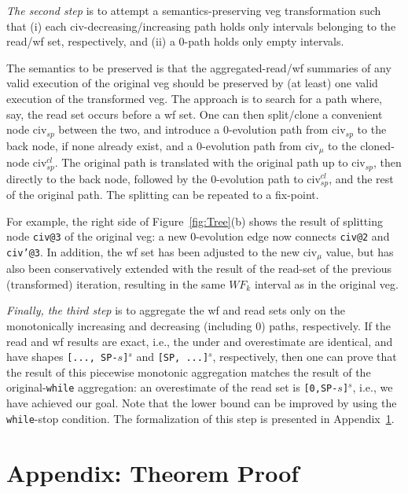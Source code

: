 \documentclass{sig-alternate}
\begin{document}
{\em The second step} is to attempt a semantics-preserving {\sc veg} transformation
such that (i) each {\sc civ}-decreasing/increasing path holds only intervals 
belonging to the read/{\sc wf} set, respectively, and (ii) a $0$-path holds
only empty intervals.

The semantics to be preserved is that the aggregated-read/{\sc wf} summaries of
any valid execution of the original {\sc veg} should be preserved by (at least) one 
valid execution of the transformed {\sc veg}.  The approach is
to search for a path where, say, the read set occurs before a {\sc wf} set.
One can then split/clone a convenient node {\sc civ}$_{sp}$ between the two, and 
introduce a $0$-evolution path from {\sc civ}$_{sp}$ to the back node, if none already exist,
and a $0$-evolution path from {\sc civ}$_\mu$ to the cloned-node {\sc civ}$_{sp}^{cl}$.
The original path is translated with the original path up to {\sc civ}$_{sp}$,
then directly to the back node, followed by the $0$-evolution path to  
{\sc civ}$_{sp}^{cl}$, and the rest of the original path. The splitting can be
repeated to a fix-point.

For example, the right side of Figure~\ref{fig:Tree}(b) shows the result of
splitting  node {\tt civ@3} of the original {\sc veg}: a new $0$-evolution
edge now connects {\tt civ@2} and {\tt civ'@3}. In addition, the {\sc wf} set 
has been adjusted to the new {\sc civ}$_\mu$ value, but has also
been conservatively extended with the result of the read-set of the previous
(transformed) iteration, resulting in the same $WF_k$ interval as 
in the original {\sc veg}. 



{\em Finally, the third step} is to aggregate the {\sc wf} and read sets 
only on the monotonically increasing and decreasing (including $0$) paths,
respectively. 
If the read and {\sc wf} results are exact, i.e., the under 
and overestimate are identical, and have shapes {\tt [..., SP-$s$]$^s$}  
and {\tt[SP, ...]$^s$}, respectively, then 
one can prove that the result of this piecewise monotonic
aggregation matches the result of the original-{\tt while} aggregation:
an overestimate of the 
read set is {\tt [0,SP-$s$]$^s$}, i.e., 
we have achieved our goal. 
Note that the lower bound can be improved by using the {\tt while}-stop condition. 
The formalization of this step is presented in Appendix~\ref{app:TheoremProof}. 

\section{Appendix: Theorem Proof} %
\label{app:TheoremProof}
\end{document}
